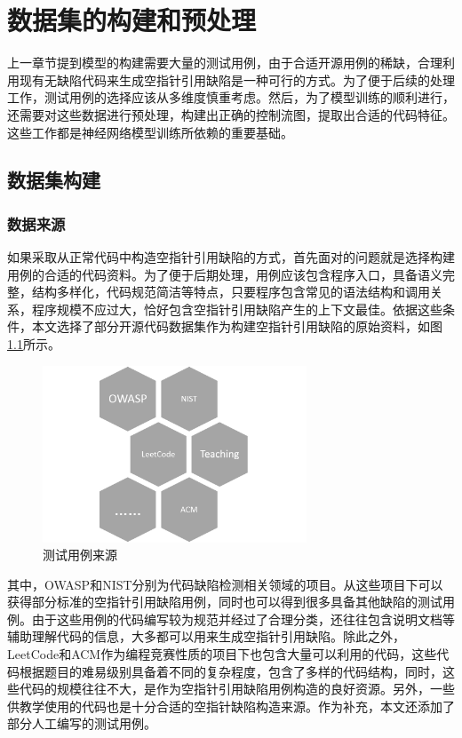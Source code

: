 \chapter{数据集的构建和预处理}

上一章节提到模型的构建需要大量的测试用例，由于合适开源用例的稀缺，合理利用现有无缺陷代码来生成空指针引用缺陷是一种可行的方式。为了便于后续的处理工作，测试用例的选择应该从多维度慎重考虑。然后，为了模型训练的顺利进行，还需要对这些数据进行预处理，构建出正确的控制流图，提取出合适的代码特征。这些工作都是神经网络模型训练所依赖的重要基础。

\section{数据集构建}
\subsection{数据来源}
如果采取从正常代码中构造空指针引用缺陷的方式，首先面对的问题就是选择构建用例的合适的代码资料。为了便于后期处理，用例应该包含程序入口，具备语义完整，结构多样化，代码规范简洁等特点，只要程序包含常见的语法结构和调用关系，程序规模不应过大，恰好包含空指针引用缺陷产生的上下文最佳。依据这些条件，本文选择了部分开源代码数据集作为构建空指针引用缺陷的原始资料，如图\ref{fig:figure4-1}所示。

\begin{figure}
	\centering
	\includegraphics[width=0.70\textwidth]{figures/resource4-1}
	\caption{测试用例来源}\label{fig:figure4-1}
\end{figure}

其中，OWASP和NIST分别为代码缺陷检测相关领域的项目。从这些项目下可以获得部分标准的空指针引用缺陷用例，同时也可以得到很多具备其他缺陷的测试用例。由于这些用例的代码编写较为规范并经过了合理分类，还往往包含说明文档等辅助理解代码的信息，大多都可以用来生成空指针引用缺陷。除此之外，LeetCode和ACM作为编程竞赛性质的项目下也包含大量可以利用的代码，这些代码根据题目的难易级别具备着不同的复杂程度，包含了多样的代码结构，同时，这些代码的规模往往不大，是作为空指针引用缺陷用例构造的良好资源。另外，一些供教学使用的代码也是十分合适的空指针缺陷构造来源。作为补充，本文还添加了部分人工编写的测试用例。

